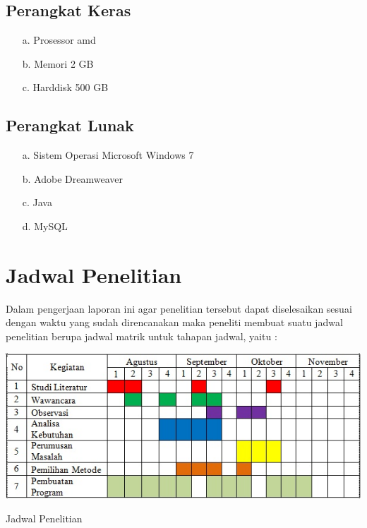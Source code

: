 \documentclass{jtetiproposalskripsi}
\begin{document}
\subsection{Perangkat Keras}
\begin{itemize}

\item[a.]	Prosessor amd
\item[b.]	Memori 2 GB
\item[c.]	Harddisk 500 GB
\end{itemize}

\subsection{Perangkat Lunak}
\begin{itemize}

\item[a.]	Sistem Operasi Microsoft Windows 7
\item[b.]	Adobe Dreamweaver
\item[c.]	Java
\item[d.]	MySQL

\end{itemize}

\section{Jadwal Penelitian}
Dalam pengerjaan laporan ini agar penelitian tersebut dapat diselesaikan sesuai dengan waktu yang sudah direncanakan maka peneliti membuat suatu jadwal penelitian berupa jadwal matrik untuk tahapan jadwal, yaitu :
\begin{table}[ht!]
\centering
\includegraphics[width=1\textwidth]{gambar/jadwal}
\caption{Jadwal Penelitian}
\label{wsn}
\end{table}
\newpage
\end{document}
